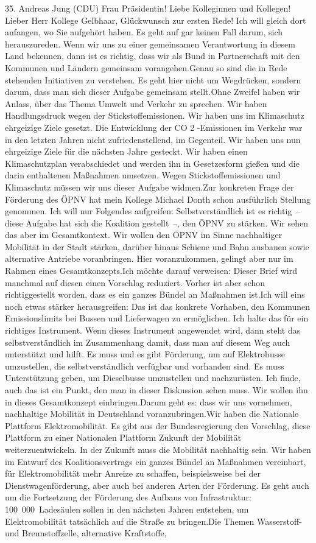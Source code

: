 \documentclass{article}
\begin{document}
	35. Andreas Jung (CDU) Frau Präsidentin! Liebe Kolleginnen und Kollegen! Lieber Herr Kollege Gelbhaar, Glückwunsch zur ersten Rede! Ich will gleich dort anfangen, wo Sie aufgehört haben. Es geht auf gar keinen Fall darum, sich herauszureden. Wenn wir uns zu einer gemeinsamen Verantwortung in diesem Land bekennen, dann ist es richtig, dass wir als Bund in Partnerschaft mit den Kommunen und Ländern gemeinsam vorangehen.Genau so sind die in Rede stehenden Initiativen zu verstehen. Es geht hier nicht um Wegdrücken, sondern darum, dass man sich dieser Aufgabe gemeinsam stellt.Ohne Zweifel haben wir Anlass, über das Thema Umwelt und Verkehr zu sprechen. Wir haben Handlungsdruck wegen der Stickstoffemissionen. Wir haben uns im Klimaschutz ehrgeizige Ziele gesetzt. Die Entwicklung der CO 2 -Emissionen im Verkehr war in den letzten Jahren nicht zufriedenstellend, im Gegenteil. Wir haben uns nun ehrgeizige Ziele für die nächsten Jahre gesteckt. Wir haben einen Klimaschutzplan verabschiedet und werden ihn in Gesetzesform gießen und die darin enthaltenen Maßnahmen umsetzen. Wegen Stickstoffemissionen und Klimaschutz müssen wir uns dieser Aufgabe widmen.Zur konkreten Frage der Förderung des ÖPNV hat mein Kollege Michael Donth schon ausführlich Stellung genommen. Ich will nur Folgendes aufgreifen: Selbstverständlich ist es richtig – diese Aufgabe hat sich die Koalition gestellt –, den ÖPNV zu stärken. Wir sehen das aber im Gesamtkontext. Wir wollen den ÖPNV im Sinne nachhaltiger Mobilität in der Stadt stärken, darüber hinaus Schiene und Bahn ausbauen sowie alternative Antriebe voranbringen. Hier voranzukommen, gelingt aber nur im Rahmen eines Gesamtkonzepts.Ich möchte darauf verweisen: Dieser Brief wird manchmal auf diesen einen Vorschlag reduziert. Vorher ist aber schon richtiggestellt worden, dass es ein ganzes Bündel an Maßnahmen ist.Ich will eins noch etwas stärker herausgreifen: Das ist das konkrete Vorhaben, den Kommunen Emissionslimits bei Bussen und Lieferwagen zu ermöglichen. Ich halte das für ein richtiges Instrument. Wenn dieses Instrument angewendet wird, dann steht das selbstverständlich im Zusammenhang damit, dass man auf diesem Weg auch unterstützt und hilft. Es muss und es gibt Förderung, um auf Elektrobusse umzustellen, die selbstverständlich verfügbar und vorhanden sind. Es muss Unterstützung geben, um Dieselbusse umzustellen und nachzurüsten. Ich finde, auch das ist ein Punkt, den man in dieser Diskussion sehen muss. Wir wollen ihn in dieses Gesamtkonzept einbringen.Darum geht es: dass wir uns vornehmen, nachhaltige Mobilität in Deutschland voranzubringen.Wir haben die Nationale Plattform Elektromobilität. Es gibt aus der Bundesregierung den Vorschlag, diese Plattform zu einer Nationalen Plattform Zukunft der Mobilität weiterzuentwickeln. In der Zukunft muss die Mobilität nachhaltig sein. Wir haben im Entwurf des Koalitionsvertrags ein ganzes Bündel an Maßnahmen vereinbart, für Elektromobilität mehr Anreize zu schaffen, beispielsweise bei der Dienstwagenförderung, aber auch bei anderen Arten der Förderung. Es geht auch um die Fortsetzung der Förderung des Aufbaus von Infrastruktur: 100 000 Ladesäulen sollen in den nächsten Jahren entstehen, um Elektromobilität tatsächlich auf die Straße zu bringen.Die Themen Wasserstoff- und Brennstoffzelle, alternative Kraftstoffe, 
\end{document}
